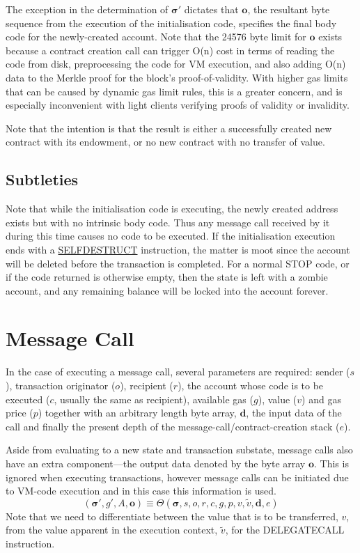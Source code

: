 \documentclass[9pt,oneside]{amsart}
\begin{document}
\begin{multicols}{2}
The exception in the determination of $\boldsymbol{\sigma}'$ dictates that $\mathbf{o}$, the resultant byte sequence from the execution of the initialisation code, specifies the final body code for the newly-created account. Note that the 24576 byte limit for $\mathbf{o}$ exists because a contract creation call can trigger O(n) cost in terms of reading the code from disk, preprocessing the code for VM execution, and also adding O(n) data to the Merkle proof for the block's proof-of-validity. With higher gas limits that can be caused by dynamic gas limit rules, this is a greater concern, and is especially inconvenient with light clients verifying proofs of validity or invalidity.

Note that the intention is that the result is either a successfully created new contract with its endowment, or no new contract with no transfer of value.

\subsection{Subtleties}
Note that while the initialisation code is executing, the newly created address exists but with no intrinsic body code. Thus any message call received by it during this time causes no code to be executed. If the initialisation execution ends with a \hyperlink{selfdestruct}{\small SELFDESTRUCT} instruction, the matter is moot since the account will be deleted before the transaction is completed. For a normal {\small STOP} code, or if the code returned is otherwise empty, then the state is left with a zombie account, and any remaining balance will be locked into the account forever.

\section{Message Call} \label{ch:call}
In the case of executing a message call, several parameters are required: sender ($s$), transaction originator ($o$), recipient ($r$), the account whose code is to be executed ($c$, usually the same as recipient), available gas ($g$), value ($v$) and gas price ($p$) together with an arbitrary length byte array, $\mathbf{d}$, the input data of the call and finally the present depth of the message-call/contract-creation stack ($e$).

Aside from evaluating to a new state and transaction substate, message calls also have an extra component---the output data denoted by the byte array $\mathbf{o}$. This is ignored when executing transactions, however message calls can be initiated due to VM-code execution and in this case this information is used.
\begin{equation}
(\boldsymbol{\sigma}', g', A, \mathbf{o}) \equiv \Theta(\boldsymbol{\sigma}, s, o, r, c, g, p, v, \tilde{v}, \mathbf{d}, e)
\end{equation}
Note that we need to differentiate between the value that is to be transferred, $v$, from the value apparent in the execution context, $\tilde{v}$, for the {\small DELEGATECALL} instruction.


\end{multicols}
\end{document}

